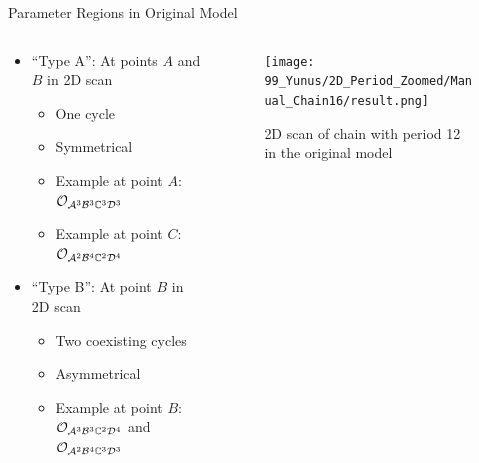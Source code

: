 \begin{frame}{Parameter Regions in Original Model}
    \begin{columns}
        \begin{column}{0.7 \textwidth}
            \begin{itemize}
                \item ``Type A'': At points $A$ and $B$ in 2D scan
                      \begin{itemize}
                          \item One cycle
                          \item Symmetrical
                          \item Example at point $A$: $\mathcal{O}_{\mathcal{A}^3\mathcal{B}^3\mathbb{C}^3\mathcal{D}^3}$
                          \item Example at point $C$: $\mathcal{O}_{\mathcal{A}^2\mathcal{B}^4\mathbb{C}^2\mathcal{D}^4}$ \vspace*{1em}
                      \end{itemize}
                \item ``Type B'': At point $B$ in 2D scan
                      \begin{itemize}
                          \item Two coexisting cycles
                          \item Asymmetrical
                          \item Example at point $B$: $\mathcal{O}_{\mathcal{A}^3\mathcal{B}^3\mathbb{C}^2\mathcal{D}^4}$ and $\mathcal{O}_{\mathcal{A}^2\mathcal{B}^4\mathbb{C}^3\mathcal{D}^3}$
                      \end{itemize}
            \end{itemize}
        \end{column}
        \begin{column}{0.3 \textwidth}
            \begin{center}
                \begin{figure}
                    \centering
                    \texttt{[image: 99\_Yunus/2D\_Period\_Zoomed/Manual\_Chain16/result.png]}
                    \caption{2D scan of chain with period 12 in the original model}
                \end{figure}
            \end{center}
        \end{column}
    \end{columns}
\end{frame}




